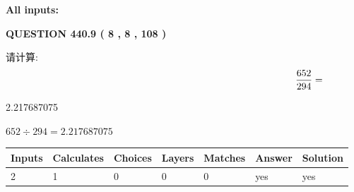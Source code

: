 \documentclass{ctexart}
\begin{document}
   
   
   
\noindent{}
   
   
   
   
\noindent\vspace{0.1in}\hspace{-0.08in} {\textbf{\Large{All inputs: }}}
   
   
  
\vspace{0.2in}
  
{\textbf{\Large{QUESTION
440.9 
 ( 8 , 8 , 108 )
}}}
  
  
 
请计算:
\begin{equation}
\frac { %
652 }  {  %
294} = \nonumber
\end{equation}
 
 
 
\noindent{}
 
 

2.217687075
 
 
\noindent{}
 
 

 
 
 
\noindent{}
 
 

$ %
652 \div  %
294=   %
2.217687075$
 
 
\noindent{}
 
 

 
   
   
   
   
\noindent\begin{tabular}{|l|l|l|l|l|l|l|}
 \hline
Inputs & Calculates & Choices & Layers & Matches & Answer & Solution \\ \hline
 2  & 
 1  & 
 0
  & 
 0  & 
 0  & 
  yes & 
  yes 
  \\ \hline
 \end{tabular}
   
   
   
   
\noindent{}
   
\end{document}
